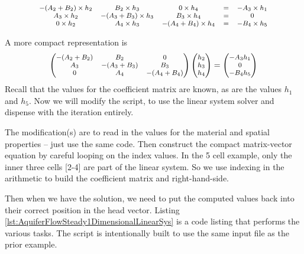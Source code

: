 \begin{displaymath}
\footnotesize
\begin{matrix}
-(A_2+B_2)\times h_2  & B_2\times h_3 & 0 \times h_4&  = & -A_3 \times h_1\\
A_3 \times h_2& -(A_3+B_3) \times h_3& B_3 \times h_4&  = & 0\\
0 \times h_2 & A_4 \times h_3 & -(A_4+B_4) \times h_4 & = & - B_4 \times h_5\\
 \end{matrix}
 \normalsize
 \end{displaymath}
 
 A more compact representation is
 \begin{displaymath}
\footnotesize
\begin{pmatrix}
-(A_2+B_2)  & B_2 & 0 \\
A_3 & -(A_3+B_3) & B_3 \\
0 & A_4 & -(A_4+B_4) \\
 \end{pmatrix}
 \begin{pmatrix}
 h_2 \\ h_3 \\ h_4 \\
 \end{pmatrix}
 =
  \begin{pmatrix}
 -A_3  h_1 \\ 0 \\ - B_4  h_5 \\
 \end{pmatrix}
 \normalsize
 \end{displaymath}
 Recall that the values for the coefficient matrix are known, as are the values $h_1$ and $h_5$.
 Now we will modify the script, to use the linear system solver and dispense with the iteration entirely.
 
 The modification(s) are to read in the values for the material and spatial properties -- just use the same code.  
 Then construct the compact matrix-vector equation by careful looping on the index values. 
 In the 5 cell example, only the inner three cells [2-4] are part of the linear system. 
 So we use indexing in the arithmetic to build the coefficient matrix and right-hand-side.
 
 Then when we have the solution, we need to put the computed values back into their correct position in the head vector.
 Listing \ref{lst:AquiferFlowSteady1DimensionalLinearSys} is a code listing that performs the various tasks.
 The script is intentionally built to use the same input file as the prior example. 
 
